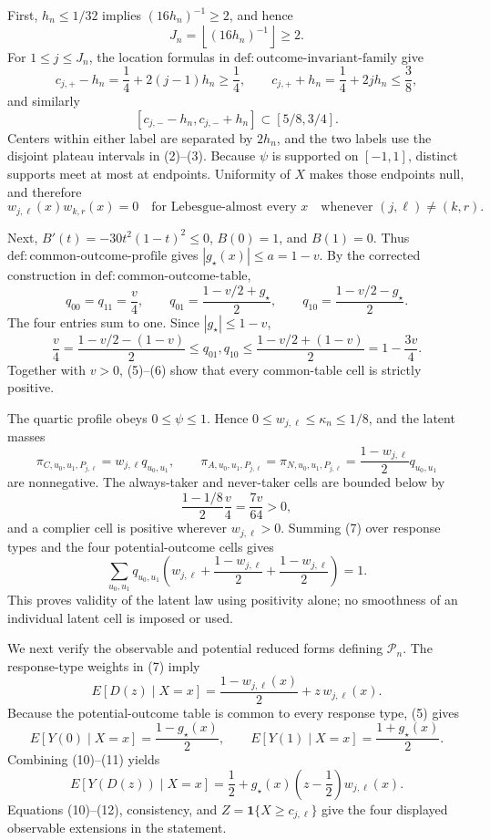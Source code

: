 First, \(h_n\le1/32\) implies \((16h_n)^{-1}\ge2\), and hence
\[
J_n=\left\lfloor(16h_n)^{-1}\right\rfloor\ge2.
\tag{1}
\]
For \(1\le j\le J_n\), the location formulas in \(\mathrm{def:outcome\mbox{-}invariant\mbox{-}family}\) give
\[
c_{j,+}-h_n=\frac14+2(j-1)h_n\ge\frac14,
\qquad
c_{j,+}+h_n=\frac14+2jh_n\le\frac38,
\tag{2}
\]
and similarly
\[
[c_{j,-}-h_n,c_{j,-}+h_n]\subset[5/8,3/4].
\tag{3}
\]
Centers within either label are separated by \(2h_n\), and the two labels use the disjoint plateau intervals in (2)--(3).  Because \(\psi\) is supported on \([-1,1]\), distinct supports meet at most at endpoints.  Uniformity of \(X\) makes those endpoints null, and therefore
\[
w_{j,\ell}(x)w_{k,r}(x)=0
\quad\text{for Lebesgue-almost every }x
\quad\text{whenever }(j,\ell)\ne(k,r).
\tag{4}
\]

Next, \(B'(t)=-30t^2(1-t)^2\le0\), \(B(0)=1\), and \(B(1)=0\).  Thus \(\mathrm{def:common\mbox{-}outcome\mbox{-}profile}\) gives \(|g_\star(x)|\le a=1-v\).  By the corrected construction in \(\mathrm{def:common\mbox{-}outcome\mbox{-}table}\),
\[
q_{00}=q_{11}=\frac v4,
\qquad
q_{01}=\frac{1-v/2+g_\star}{2},
\qquad
q_{10}=\frac{1-v/2-g_\star}{2}.
\tag{5}
\]
The four entries sum to one.  Since \(|g_\star|\le1-v\),
\[
\frac v4
=\frac{1-v/2-(1-v)}2
\le q_{01},q_{10}
\le\frac{1-v/2+(1-v)}2
=1-\frac{3v}{4}.
\tag{6}
\]
Together with \(v>0\), (5)--(6) show that every common-table cell is strictly positive.

The quartic profile obeys \(0\le\psi\le1\).  Hence \(0\le w_{j,\ell}\le\kappa_n\le1/8\), and the latent masses
\[
\pi_{C,u_0,u_1,P_{j,\ell}}=w_{j,\ell}q_{u_0,u_1},
\qquad
\pi_{A,u_0,u_1,P_{j,\ell}}
=\pi_{N,u_0,u_1,P_{j,\ell}}
=\frac{1-w_{j,\ell}}2q_{u_0,u_1}
\tag{7}
\]
are nonnegative.  The always-taker and never-taker cells are bounded below by
\[
\frac{1-1/8}{2}\frac v4=\frac{7v}{64}>0,
\tag{8}
\]
and a complier cell is positive wherever \(w_{j,\ell}>0\).  Summing (7) over response types and the four potential-outcome cells gives
\[
\sum_{u_0,u_1}q_{u_0,u_1}
\left(w_{j,\ell}+\frac{1-w_{j,\ell}}2+
                    \frac{1-w_{j,\ell}}2\right)=1.
\tag{9}
\]
This proves validity of the latent law using positivity alone; no smoothness of an individual latent cell is imposed or used.

We next verify the observable and potential reduced forms defining \(\mathcal P_n\).  The response-type weights in (7) imply
\[
E[D(z)\mid X=x]=\frac{1-w_{j,\ell}(x)}2+z\,w_{j,\ell}(x).
\tag{10}
\]
Because the potential-outcome table is common to every response type, (5) gives
\[
E[Y(0)\mid X=x]=\frac{1-g_\star(x)}2,
\qquad
E[Y(1)\mid X=x]=\frac{1+g_\star(x)}2.
\tag{11}
\]
Combining (10)--(11) yields
\[
E[Y(D(z))\mid X=x]
=\frac12+g_\star(x)\left(z-\frac12\right)w_{j,\ell}(x).
\tag{12}
\]
Equations (10)--(12), consistency, and \(Z=\mathbf 1\{X\ge c_{j,\ell}\}\) give the four displayed observable extensions in the statement.

